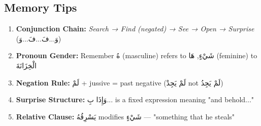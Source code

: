 \documentclass[letter,12pt]{article}
\begin{document}
\subsection{Memory Tips}
\begin{enumerate}
\item \textbf{Conjunction Chain:} \textit{Search → Find (negated) → See → Open → Surprise} (\textarabic{وَ...فَ...فَ...وَ})
\item \textbf{Pronoun Gender:} Remember \textarabic{هُ} (masculine) refers to \textarabic{شَيْءٍ}, \textarabic{هَا} (feminine) to \textarabic{الْخِزَانَةَ}
\item \textbf{Negation Rule:} \textarabic{لَمْ} + jussive = past negative (\textarabic{لَمْ يَجِدْ} not \textarabic{لَمْ يَجِدُ})
\item \textbf{Surprise Structure:} \textarabic{وَإِذَا بِ...} is a fixed expression meaning "and behold..."
\item \textbf{Relative Clause:} \textarabic{يَسْرِقُهُ} modifies \textarabic{شَيْءٍ} — "something that he steals"
\end{enumerate}
\end{document}
